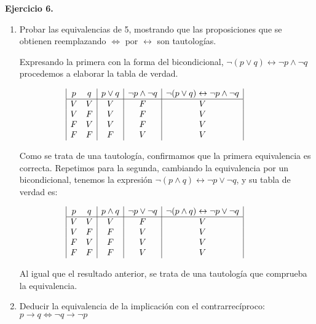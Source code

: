 \textbf{Ejercicio 6.}
\begin{enumerate}
	\item Probar las equivalencias de 5, mostrando que las proposiciones que se obtienen reemplazando $\Leftrightarrow$ por $\leftrightarrow$ son
	tautologías.
	
	Expresando la primera con la forma del bicondicional, $\neg(p \vee q) \leftrightarrow \neg p \wedge \neg q$ procedemos a elaborar la tabla de verdad.
	
	\begin{displaymath}
		\hspace*{-1cm}
		\begin{array}{|c c|c|c|c|}
			p & q & p \vee q & \neg p \wedge \neg q & \neg(p \vee q) \leftrightarrow \neg p \wedge \neg q\\
			\hline 
			V & V & V & F & V\\
			V & F & V & F & V\\
			F & V & V & F & V\\
			F & F & F & V & V\\
		\end{array}
	\end{displaymath}
	
	Como se trata de una tautolog\'ia, confirmamos que la primera equivalencia es correcta. Repetimos para la segunda, cambiando la equivalencia por un bicondicional, tenemos la expresi\'on $\neg(p \wedge q) \leftrightarrow \neg p \vee \neg q$, y su tabla de verdad es:
	
	\begin{displaymath}
		\hspace*{-1cm}
		\begin{array}{|c c|c|c|c|}
			p & q & p \wedge q & \neg p \vee \neg q & \neg(p \wedge q) \leftrightarrow \neg p \vee \neg q\\
			\hline 
			V & V & V & F & V\\
			V & F & F & V & V\\
			F & V & F & V & V\\
			F & F & F & V & V\\
		\end{array}
	\end{displaymath}
	
	Al igual que el resultado anterior, se trata de una tautolog\'ia que comprueba la equivalencia.
	
	\item Deducir la equivalencia de la implicación con el contrarrecíproco: $p \rightarrow q \Leftrightarrow \neg q \rightarrow \neg p$
	

\end{enumerate}
